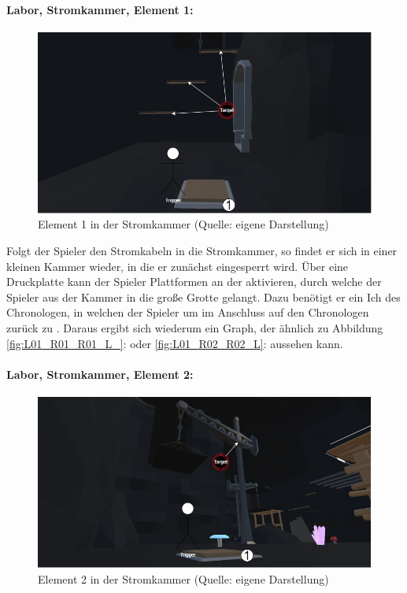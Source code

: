 \paragraph{Labor, Stromkammer, Element 1:}\label{p:lse1}
\begin{figure}[ht]
\centering
\includegraphics[width=0.8\linewidth]{content/pictures/Raetsel-L02_R01_R01.jpg}
\caption{Element 1 in der Stromkammer (Quelle: eigene Darstellung)}
\label{fig:L02_R01_R01}
\end{figure}

Folgt der Spieler den Stromkabeln in die Stromkammer, so findet er sich in einer kleinen Kammer wieder, in die er zunächst eingesperrt wird. Über eine Druckplatte kann der Spieler Plattformen an der aktivieren, durch welche der Spieler aus der Kammer in die große Grotte gelangt.
Dazu benötigt er ein Ich des Chronologen, in welchen der Spieler  um im Anschluss auf den Chronologen zurück zu  . Daraus ergibt sich wiederum ein Graph, der ähnlich zu Abbildung \ref{fig:L01_R01_R01_L_}:  oder \ref{fig:L01_R02_R02_L}:  aussehen kann.

\paragraph{Labor, Stromkammer, Element 2:}\label{p:lse2}

\begin{figure}[ht]
\centering
\includegraphics[width=0.8\linewidth]{content/pictures/Raetsel-L02_R01_R02.jpg}
\caption{Element 2 in der Stromkammer (Quelle: eigene Darstellung)}
\label{fig:L02_R01_R02}
\end{figure}

